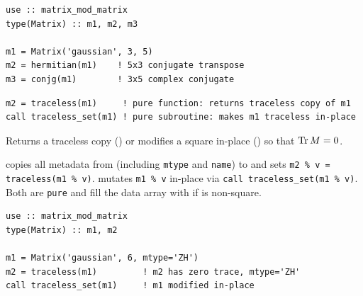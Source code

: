 \lstset{language=[95]Fortran}
\begin{lstlisting}
use :: matrix_mod_matrix
type(Matrix) :: m1, m2, m3

m1 = Matrix('gaussian', 3, 5)
m2 = hermitian(m1)    ! 5x3 conjugate transpose
m3 = conjg(m1)        ! 3x5 complex conjugate
\end{lstlisting}


\lstset{language=[95]Fortran}
\begin{lstlisting}
m2 = traceless(m1)     ! pure function: returns traceless copy of m1
call traceless_set(m1) ! pure subroutine: makes m1 traceless in-place
\end{lstlisting}

Returns a traceless copy () or modifies a square  in-place () so that ${\rm Tr\,} M = 0$.

 copies all metadata from  (including \texttt{mtype} and \texttt{name}) to  and sets \texttt{m2 \% v = traceless(m1 \% v)}.  mutates \texttt{m1 \% v} in-place via \texttt{call traceless\_set(m1 \% v)}. Both are \texttt{pure} and fill the data array with  if  is non-square.

\begin{description}[leftmargin=2.2cm, style=nextline]
\end{description}

\lstset{language=[95]Fortran}
\begin{lstlisting}
use :: matrix_mod_matrix
type(Matrix) :: m1, m2

m1 = Matrix('gaussian', 6, mtype='ZH')
m2 = traceless(m1)         ! m2 has zero trace, mtype='ZH'
call traceless_set(m1)     ! m1 modified in-place
\end{lstlisting}

